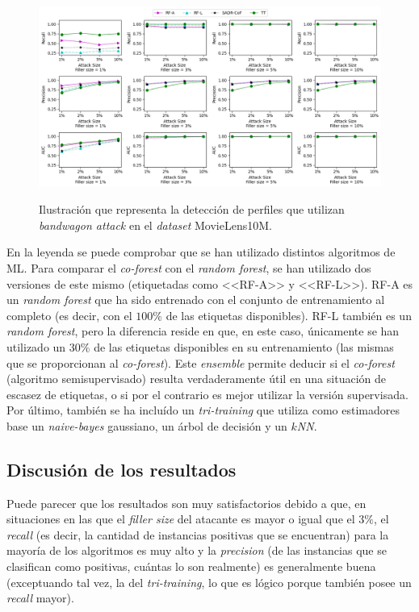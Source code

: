 \begin{figure}[h]
	\caption[\textit{Bandwagon attack}: detección]{Ilustración que representa la detección de perfiles que utilizan \textit{bandwagon attack} en el \textit{dataset} MovieLens10M.}
	\centering
	\includegraphics[width=\textwidth]{../img/memoria/5_resultados_bandwagon_attack}
	\label{5_bandwagon_attack}
\end{figure}

En la leyenda se puede comprobar que se han utilizado distintos algoritmos de ML. Para comparar el \textit{co-forest} con el \textit{random forest}, se han utilizado dos versiones de este mismo (etiquetadas como <<RF-A>> y <<RF-L>>). RF-A es un \textit{random forest} que ha sido entrenado con el conjunto de entrenamiento al completo (es decir, con el $100\%$ de las etiquetas disponibles). RF-L también es un \textit{random forest}, pero la diferencia reside en que, en este caso, únicamente se han utilizado un $30\%$ de las etiquetas disponibles en su entrenamiento (las mismas que se proporcionan al \textit{co-forest}). Este \textit{ensemble} permite deducir si el \textit{co-forest} (algoritmo semisupervisado) resulta verdaderamente útil en una situación de escasez de etiquetas, o si por el contrario es mejor utilizar la versión supervisada. Por último, también se ha incluído un \textit{tri-training} que utiliza como estimadores base un \textit{naive-bayes} gaussiano, un árbol de decisión y un \textit{$k$NN}.

\subsection{Discusión de los resultados}

Puede parecer que los resultados son muy satisfactorios debido a que, en situaciones en las que el \textit{filler size} del atacante es mayor o igual que el $3\%$, el \textit{recall} (es decir, la cantidad de instancias positivas que se encuentran) para la mayoría de los algoritmos es muy alto y la \textit{precision} (de las instancias que se clasifican como positivas, cuántas lo son realmente) es generalmente buena (exceptuando tal vez, la del \textit{tri-training}, lo que es lógico porque también posee un \textit{recall} mayor).

